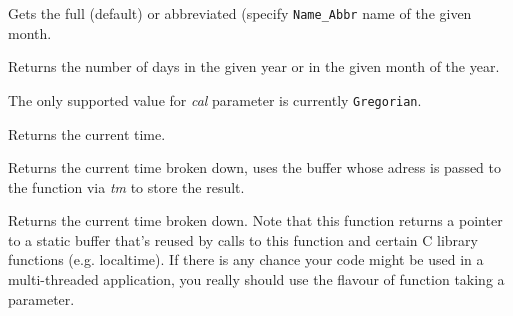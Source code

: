

\label{wxdatetimegetmonthname}


Gets the full (default) or abbreviated (specify {\tt Name\_Abbr} name of the
given month.




\label{wxdatetimegetnumberofdays}



Returns the number of days in the given year or in the given month of the
year.

The only supported value for {\it cal} parameter is currently {\tt Gregorian}.



\label{wxdatetimegettimenow}


Returns the current time.


\label{wxdatetimegettmnow}


Returns the current time broken down, uses the buffer whose adress is
passed to the function via {\it tm} to store the result.



Returns the current time broken down. Note that this function returns a
pointer to a static buffer that's reused by calls to this function and
certain C library functions (e.g. localtime). If there is any chance your
code might be used in a multi-threaded application, you really should use
the flavour of function 
taking a parameter.

